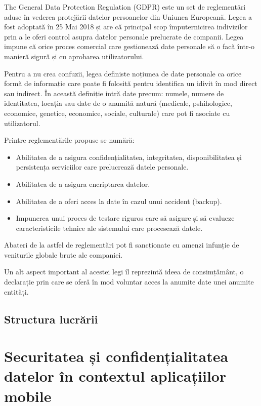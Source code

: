 \documentclass[12pt]{article}
\begin{document}
The General Data Protection Regulation (GDPR) este un set de reglementări aduse în vederea protejării datelor
persoanelor din Uniunea Europeană. Legea a fost adoptată în 25 Mai 2018 și are că principal scop împuternicirea
indivizilor prin a le oferi control asupra datelor personale prelucrate de companii. Legea impune că 
orice proces comercial care gestionează date personale să o facă într-o manieră sigură și cu aprobarea
utilizatorului.

Pentru a nu crea confuzii, legea definiste noțiunea de date personale ca orice formă de informație
care poate fi folosită pentru identifica un idivit în mod direct sau indirect. În această definiție intră
date precum: numele, numere de identitatea, locația sau date de o anumită natură (medicale, pshihologice, 
economice, genetice, economice, sociale, culturale) care pot fi asociate cu utilizatorul.

Printre reglementările propuse se numără:
\begin{itemize}
    \item Abilitatea de a asigura confidențialitatea, integritatea, disponibilitatea și persistența
    serviciilor care prelucrează datele personale.
    \item Abilitatea de a asigura encriptarea datelor.
    \item Abilitatea de a oferi acces la date în cazul unui accident (backup).
    \item Impunerea unui proces de testare riguros care să asigure și să evalueze caracteristicile
    tehnice ale sistemului care procesează datele.
\end{itemize}

Abateri de la astfel de reglementări pot fi sancționate cu amenzi infunție de
veniturile globale brute ale companiei.

Un alt aspect important al acestei legi îl reprezintă ideea de consimțământ, o declarație prin care
se oferă în mod voluntar acces la anumite date unei anumite entități. 

\newpage
\subsection{Structura lucrării}

\section{Securitatea și confidențialitatea datelor în contextul aplicațiilor mobile}
\end{document}
